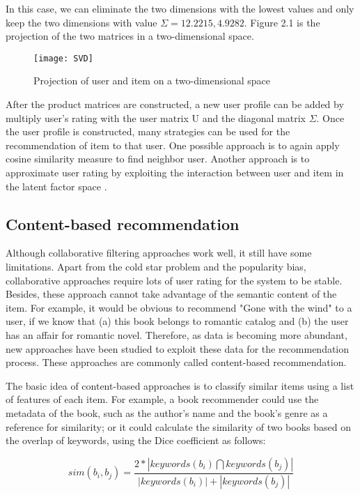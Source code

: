 In this case, we can eliminate the two dimensions with the lowest values and only keep the two dimensions with value \(\Sigma = {12.2215, 4.9282} \). Figure 2.1 is the projection of the two matrices in a two-dimensional space.

\begin{figure}[h]
\texttt{[image: SVD]}
\centering
\caption{Projection of user and item on a two-dimensional space}

\end{figure}

After the product matrices are constructed, a new user profile can be added by multiply user's rating with the user matrix U and the diagonal matrix \(\Sigma\). Once the user profile is constructed, many strategies can be used for the recommendation of item to that user. One possible approach is to again apply cosine similarity measure to find neighbor user. Another approach is to approximate user rating by exploiting the interaction between user and item in the latent factor space \cite{koren2009matrix}.

\subsection{Content-based recommendation}
Although collaborative filtering approaches work well, it still have some limitations. Apart from the cold star problem and the popularity bias, collaborative approaches require lots of user rating for the system to be stable. Besides, these approach cannot take advantage of the semantic content of the item. For example, it would be obvious to recommend "Gone with the wind" to a user, if we know that (a) this book belongs to romantic catalog and (b) the user has an affair for romantic novel. Therefore, as data is becoming more abundant, new approaches have been studied to exploit these data for the recommendation process. These approaches are commonly called content-based recommendation.

The basic idea of content-based approaches is to classify similar items using a list of features of each item. For example, a book recommender could use the metadata of the book, such as the author's name and the book's genre as a reference for similarity; or it could calculate the similarity of two books based on the overlap of keywords, using the Dice coefficient \cite{salton1988syntactic} as follows:

\begin{displaymath}
sim(b_i, b_j) = \frac{2 * |keywords(b_i) \bigcap keywords(b_j)| }{|keywords(b_i)| + |keywords(b_j)|}
\end{displaymath}

